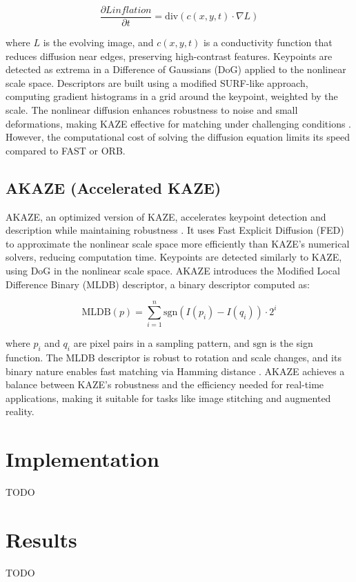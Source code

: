 \documentclass[journal]{IEEEtran}
\begin{document}
\begin{equation}
\frac{\partial L inflation}{\partial t} = \text{div}(c(x, y, t) \cdot \nabla L)
\end{equation}

where \( L \) is the evolving image, and \( c(x, y, t) \) is a conductivity function that reduces diffusion near edges, preserving high-contrast features. Keypoints are detected as extrema in a Difference of Gaussians (DoG) applied to the nonlinear scale space. Descriptors are built using a modified SURF-like approach, computing gradient histograms in a grid around the keypoint, weighted by the scale. The nonlinear diffusion enhances robustness to noise and small deformations, making KAZE effective for matching under challenging conditions \cite{KAZE}. However, the computational cost of solving the diffusion equation limits its speed compared to FAST or ORB.

\subsection{AKAZE (Accelerated KAZE)}
AKAZE, an optimized version of KAZE, accelerates keypoint detection and description while maintaining robustness \cite{KAZE}. It uses Fast Explicit Diffusion (FED) to approximate the nonlinear scale space more efficiently than KAZE’s numerical solvers, reducing computation time. Keypoints are detected similarly to KAZE, using DoG in the nonlinear scale space. AKAZE introduces the Modified Local Difference Binary (MLDB) descriptor, a binary descriptor computed as:

\begin{equation}
\text{MLDB}(p) = \sum_{i=1}^{n} \text{sgn}(I(p_i) - I(q_i)) \cdot 2^i
\end{equation}

where \( p_i \) and \( q_i \) are pixel pairs in a sampling pattern, and \( \text{sgn} \) is the sign function. The MLDB descriptor is robust to rotation and scale changes, and its binary nature enables fast matching via Hamming distance \cite{KAZE}. AKAZE achieves a balance between KAZE’s robustness and the efficiency needed for real-time applications, making it suitable for tasks like image stitching and augmented reality.

\section{Implementation}
TODO

\section{Results}
TODO
\end{document}
